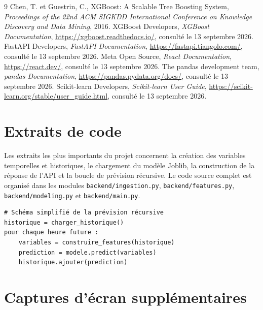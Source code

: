 \documentclass[12pt,a4paper]{report}
\begin{document}
\renewcommand{\bibname}{Bibliographie et Webographie}

\begin{thebibliography}{9}
	Chen, T. et Guestrin, C., \og XGBoost: A Scalable Tree Boosting System\fg{},
	\textit{Proceedings of the 22nd ACM SIGKDD International Conference on
	Knowledge Discovery and Data Mining}, 2016.
	XGBoost Developers, \textit{XGBoost Documentation},
	\url{https://xgboost.readthedocs.io/}, consulté le 13 septembre 2026.
	FastAPI Developers, \textit{FastAPI Documentation},
	\url{https://fastapi.tiangolo.com/}, consulté le 13 septembre 2026.
	Meta Open Source, \textit{React Documentation},
	\url{https://react.dev/}, consulté le 13 septembre 2026.
	The pandas development team, \textit{pandas Documentation},
	\url{https://pandas.pydata.org/docs/}, consulté le 13 septembre 2026.
	Scikit-learn Developers, \textit{Scikit-learn User Guide},
	\url{https://scikit-learn.org/stable/user_guide.html}, consulté le 13 septembre 2026.
\end{thebibliography}

\appendix

\chapter{Extraits de code}

Les extraits les plus importants du projet concernent la création des
variables temporelles et historiques, le chargement du modèle Joblib, la
construction de la réponse de l'API et la boucle de prévision récursive. Le
code source complet est organisé dans les modules
\texttt{backend/ingestion.py}, \texttt{backend/features.py},
\texttt{backend/modeling.py} et \texttt{backend/main.py}.

\begin{verbatim}
# Schéma simplifié de la prévision récursive
historique = charger_historique()
pour chaque heure future :
	variables = construire_features(historique)
	prediction = modele.predict(variables)
	historique.ajouter(prediction)
\end{verbatim}

\chapter{Captures d'écran supplémentaires}
\end{document}
